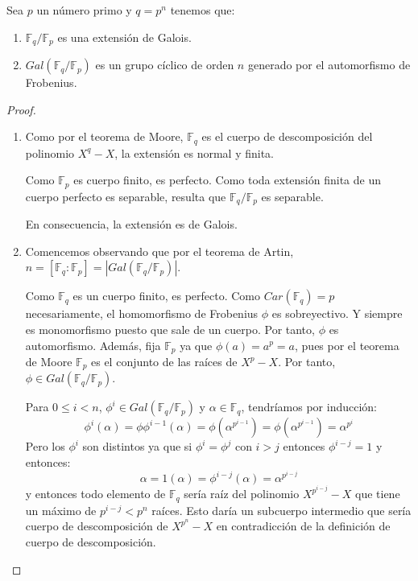 \begin{theorem}
Sea $p$ un número primo y $q = p^n$ tenemos que:

\begin{enumerate}
\item $\mathbb{F}_q/\mathbb{F}_p$ es una extensión de Galois. 
\item $Gal(\mathbb{F}_q/\mathbb{F}_p)$ es un grupo cíclico de orden $n$ generado por el automorfismo de Frobenius. 
\end{enumerate}
\end{theorem}
\begin{proof}
\begin{enumerate}
\item Como por el teorema de Moore, $\mathbb{F}_q$ es el cuerpo de descomposición del polinomio $X^q - X$, la extensión es normal y finita. 

Como $\mathbb{F}_p$ es cuerpo finito, es perfecto. Como toda extensión finita de un cuerpo perfecto es separable, resulta que $\mathbb{F}_q/\mathbb{F}_p$ es separable. 

En consecuencia, la extensión es de Galois. 

\item Comencemos observando que por el teorema de Artin, $n = [\mathbb{F}_q:\mathbb{F}_p] = |Gal(\mathbb{F}_q/\mathbb{F}_p)|$. 

Como $\mathbb{F}_q$ es un cuerpo finito, es perfecto. Como $Car(\mathbb{F}_q) = p$ necesariamente, el homomorfismo de Frobenius $\phi$ es sobreyectivo. Y siempre es monomorfismo puesto que sale de un cuerpo. Por tanto, $\phi$ es automorfismo.  Además, fija $\mathbb{F}_p$ ya que $\phi(a) = a^p = a$, pues por el teorema de Moore $\mathbb{F}_p$ es el conjunto de las raíces de $X^p - X$. Por tanto, $\phi \in Gal(\mathbb{F}_q/\mathbb{F}_p)$.

Para $0 \le i < n$, $\phi^i \in Gal(\mathbb{F}_q/\mathbb{F}_p)$ y $\alpha \in \mathbb{F}_q$, tendríamos por inducción: $$\phi^i(\alpha) = \phi \phi^{i-1}(\alpha) = \phi(\alpha^{p^{i-1}}) = \phi(\alpha^{p^{i-1}}) = \alpha^{p^i}$$ Pero los $\phi^i$ son distintos ya que si $\phi^i = \phi^j$ con $i > j$ entonces $\phi^{i-j} = 1$ y entonces: $$\alpha = 1(\alpha) = \phi^{i-j}(\alpha) = \alpha^{p^{i-j}}$$ y entonces todo elemento de $\mathbb{F}_q$ sería raíz del polinomio $X^{p^{i-j}} - X$ que tiene un máximo de $p^{i-j} < p^n$ raíces. Esto daría un subcuerpo intermedio que sería cuerpo de descomposición de $X^{p^n}-X$ en contradicción de la definición de cuerpo de descomposición. 
\end{enumerate}
\end{proof}

